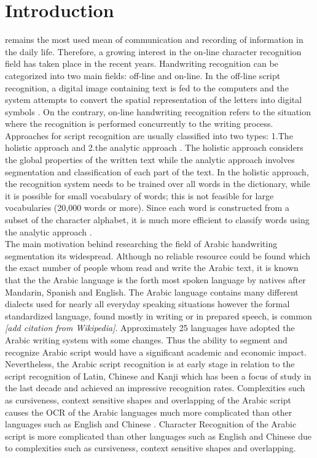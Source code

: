\documentclass[journal,compsoc]{IEEEtran}
\begin{document}
\IEEEdisplaynotcompsoctitleabstractindextext

\section{Introduction}
\date
{} remains the most used mean of communication and recording of information in the daily life. Therefore, a growing interest in the on-line character recognition field has taken place in the recent years. Handwriting recognition can be categorized into two main fields: off-line and on-line. In the off-line script recognition, a digital image containing text is fed to the computers and the system attempts to convert the spatial representation of the letters into digital symbols \cite{al2011online}. On the contrary, on-line handwriting recognition refers to the situation where the recognition is performed concurrently to the writing process. Approaches for script recognition are usually classified into two types: 1.The holistic approach \cite{biadsy2011segmentation} and 2.the analytic approach \cite{abdulla2008off, sari2002off, Dinges2011, elanwar2012unconstrained}. The holistic approach considers the global properties of the written text while the analytic approach involves segmentation and classification of each part of the text.  In the holistic approach, the recognition system needs to be trained over all words in the dictionary, while it is possible for small vocabulary of words; this is not feasible for large vocabularies (20,000 words or more). Since each word is constructed from a subset of the character alphabet, it is much more efficient to classify words using the analytic approach \cite{elanwar2012unconstrained}.\\

The main motivation behind researching the field of Arabic handwriting segmentation its widespread. Although no reliable resource could be found which the exact number of people whom read and write the Arabic text, it is known that the the Arabic language is the forth most spoken language by natives after Mandarin, Spanish and English. The Arabic language contains many different dialects used for nearly all everyday speaking situations however the formal standardized language, found mostly in writing or in prepared speech, is common \emph{[add citation from Wikipedia]}.  Approximately 25 languages have adopted the Arabic writing system with some changes. Thus the ability to segment and recognize Arabic script would have a significant academic and economic impact. Nevertheless, the Arabic script recognition is at early stage in relation to the script recognition of Latin, Chinese and Kanji which has been a focus of study in the last decade and achieved an impressive recognition rates. Complexities such as cursiveness, context sensitive shapes and overlapping of the Arabic script causes the OCR of the Arabic languages much more complicated than other languages such as English and Chinese \cite{razzak2010locally}. 
Character Recognition of the Arabic script is more complicated than other languages such as English and Chinese due to complexities such as cursiveness, context sensitive shapes and overlapping. 
\end{document}
